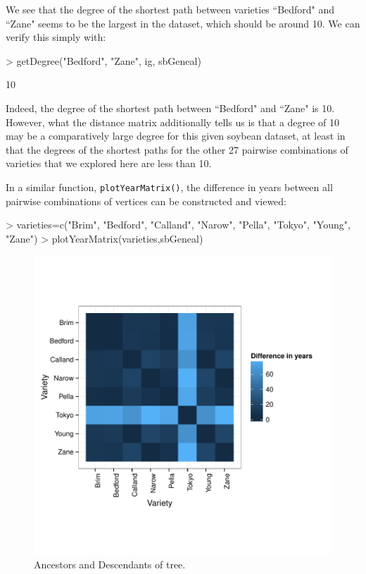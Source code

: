 \documentclass{article}
\numberwithin{equation}{section} %
\begin{document}
We see that the degree of the shortest path between varieties ``Bedford" and ``Zane" seems to be the largest in the dataset, which should be around 10. We can verify this simply with:

\begin{Schunk}
\begin{Sinput}
> getDegree("Bedford", "Zane", ig, sbGeneal)
\end{Sinput}
\begin{Soutput}
[1] 10
\end{Soutput}
\end{Schunk}

Indeed, the degree of the shortest path between ``Bedford" and ``Zane" is 10. However, what the distance matrix additionally tells us is that a degree of 10 may be a comparatively large degree for this given soybean dataset, at least in that the degrees of the shortest paths for the other 27 pairwise combinations of varieties that we explored here are less than 10.

In a similar function, \texttt{plotYearMatrix()}, the difference in years between all pairwise combinations of vertices can be constructed and viewed:

\begin{Schunk}
\begin{Sinput}
> varieties=c("Brim", "Bedford", "Calland", "Narow", "Pella", "Tokyo", "Young", "Zane")
> plotYearMatrix(varieties,sbGeneal)
\end{Sinput}
\end{Schunk}

\begin{figure} 
  \begin{center} 
\includegraphics{ggenealogy-plotYearMatrix1}
\end{center} 
\caption{Ancestors and Descendants of tree.}
\label{fig:plotYearMatrix1}
\end{figure}
\end{document}

